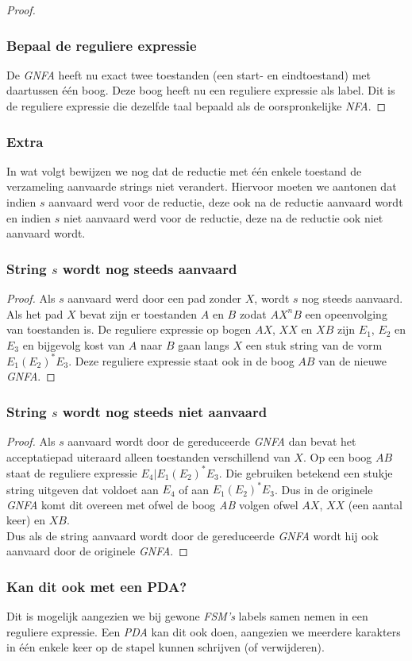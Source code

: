 \begin{proof}
\subsubsection*{Bepaal de reguliere expressie}
De \emph{GNFA} heeft nu exact twee toestanden (een start- en eindtoestand) met daartussen \'e\'en boog. Deze boog heeft nu een reguliere expressie als label. Dit is de reguliere expressie die dezelfde taal bepaald als de oorspronkelijke \emph{NFA}.
\end{proof}

\subsubsection*{Extra}
In wat volgt bewijzen we nog dat de reductie met \'e\'en enkele toestand de verzameling aanvaarde strings niet verandert. Hiervoor moeten we aantonen dat indien $s$ aanvaard werd voor de reductie, deze ook na de reductie aanvaard wordt en indien $s$ niet aanvaard werd voor de reductie, deze na de reductie ook niet aanvaard wordt.\\
\subsubsection*{String $s$ wordt nog steeds aanvaard}
\begin{proof}
Als $s$ aanvaard werd door een pad zonder $X$, wordt $s$ nog steeds aanvaard. Als het pad $X$ bevat zijn er toestanden $A$ en $B$ zodat $AX^nB$ een opeenvolging van toestanden is. De reguliere expressie op bogen $AX$, $XX$ en $XB$ zijn $E_1$, $E_2$ en $E_3$ en bijgevolg kost van $A$ naar $B$ gaan langs $X$ een stuk string van de vorm $E_1  (E_2)^* E_3$. Deze reguliere expressie staat ook in de boog $AB$ van de nieuwe \emph{GNFA}.
\end{proof}
\subsubsection*{String $s$ wordt nog steeds niet aanvaard}
\begin{proof}
Als $s$ aanvaard wordt door de gereduceerde \emph{GNFA} dan bevat het acceptatiepad uiteraard alleen toestanden verschillend van $X$. Op een boog $AB$ staat de reguliere expressie $E_4 | E_1 (E_2)^* E_3$. Die gebruiken betekend een stukje string uitgeven dat voldoet aan $E_4$ of aan $E_1 (E_2)^* E_3$. Dus in de originele \emph{GNFA} komt dit overeen met ofwel de boog \emph{AB} volgen ofwel $AX$, $XX$ (een aantal keer) en $XB$.\\
Dus als de string aanvaard wordt door de gereduceerde \emph{GNFA} wordt hij ook aanvaard door de originele \emph{GNFA}.
\end{proof}

\subsubsection*{Kan dit ook met een PDA?}
Dit is mogelijk aangezien we bij gewone \emph{FSM's} labels samen nemen in een reguliere expressie. Een \emph{PDA} kan dit ook doen, aangezien we meerdere karakters in \'e\'en enkele keer op de stapel kunnen schrijven (of verwijderen).
